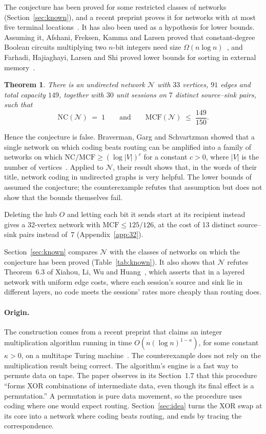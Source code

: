 \documentclass[11pt]{article}
\newtheorem{theorem}{Theorem}
\newcommand{\NC}{\mathrm{NC}}
\newcommand{\MCF}{\mathrm{MCF}}
\begin{document}
The conjecture has been proved for some restricted classes of networks (Section~\ref{sec:known}), and a recent preprint proves it for networks with at most five terminal locations~\cite{LQLL26}. It has also been used as a hypothesis for lower bounds. Assuming it, Afshani, Freksen, Kamma and Larsen proved that constant-degree Boolean circuits multiplying two $n$-bit integers need size $\Omega(n\log n)$~\cite{AFKL19}, and Farhadi, Hajiaghayi, Larsen and Shi proved lower bounds for sorting in external memory~\cite{FHLS19}.

\begin{theorem}\label{thm:main}
There is an undirected network $\mathcal N$ with $33$ vertices, $91$ edges and total capacity $149$, together with $30$ unit sessions on $7$ distinct source--sink pairs, such that
\[
\NC(\mathcal N)\;=\;1
\qquad\text{and}\qquad
\MCF(\mathcal N)\;\le\;\frac{149}{150}.
\]
\end{theorem}

Hence the conjecture is false. Braverman, Garg and Schvartzman showed that a single network on which coding beats routing can be amplified into a family of networks on which $\NC/\MCF\ge(\log|V|)^c$ for a constant $c>0$, where $|V|$ is the number of vertices~\cite{BGS17}. Applied to $\mathcal N$, their result shows that, in the words of their title, network coding in undirected graphs is very helpful. The lower bounds of~\cite{AFKL19,FHLS19} assumed the conjecture; the counterexample refutes that assumption but does not show that the bounds themselves fail.

Deleting the hub $O$ and letting each bit it sends start at its recipient instead gives a 32-vertex network with $\MCF\le125/126$, at the cost of 13 distinct source--sink pairs instead of~7 (Appendix~\ref{app:32}).

Section~\ref{sec:known} compares $\mathcal N$ with the classes of networks on which the conjecture has been proved (Table~\ref{tab:known}). It also shows that $\mathcal N$ refutes Theorem~6.3 of Xiahou, Li, Wu and Huang~\cite{XLWH14}, which asserts that in a layered network with uniform edge costs, where each session's source and sink lie in different layers, no code meets the sessions' rates more cheaply than routing does.

\paragraph{Origin.} The construction comes from a recent preprint that claims an integer multiplication algorithm running in time $O(n(\log n)^{1-\kappa})$, for some constant $\kappa>0$, on a multitape Turing machine~\cite{OAI26}. The counterexample does not rely on the multiplication result being correct. The algorithm's engine is a fast way to permute data on tape. The paper observes in its Section~1.7 that this procedure ``forms XOR combinations of intermediate data, even though its final effect is a permutation.'' A permutation is pure data movement, so the procedure uses coding where one would expect routing. Section~\ref{sec:idea} turns the XOR swap at its core into a network where coding beats routing, and ends by tracing the correspondence.
\end{document}
